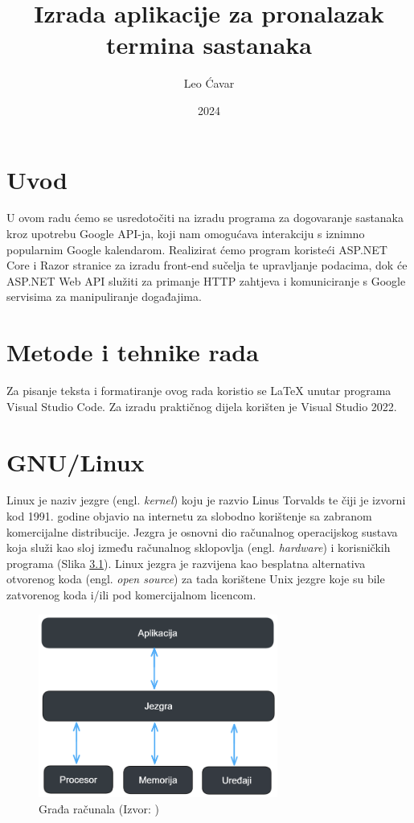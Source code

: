\documentclass{foi}
\title{Izrada aplikacije za pronalazak termina sastanaka}
\author{Leo Ćavar}
\date{2024}
\begin{document}
\maketitle

\tableofcontents

\pagestyle{plain}
\chapter{Uvod}
U ovom radu ćemo se usredotočiti na izradu programa za dogovaranje sastanaka kroz upotrebu Google API-ja, koji nam omogućava interakciju s iznimno popularnim Google kalendarom. Realizirat ćemo program koristeći ASP.NET Core i Razor stranice za izradu front-end sučelja te upravljanje podacima, dok će ASP.NET Web API služiti za primanje HTTP zahtjeva i komuniciranje s Google servisima za manipuliranje događajima.

\chapter{Metode i tehnike rada}
Za pisanje teksta i formatiranje ovog rada koristio se LaTeX unutar programa Visual Studio Code. Za izradu praktičnog dijela korišten je Visual Studio 2022.

\chapter{GNU/Linux}
Linux je naziv jezgre (engl. \textit{kernel}) koju je razvio Linus Torvalds te čiji je izvorni kod 1991. godine objavio na internetu za slobodno korištenje sa zabranom komercijalne distribucije.\cite{GNU} Jezgra je osnovni dio računalnog operacijskog sustava koja služi kao sloj između računalnog sklopovlja (engl. \textit{hardware}) i korisničkih programa\cite{Carnet} (Slika \ref{fig:grada}). Linux jezgra je razvijena kao besplatna alternativa otvorenog koda (engl. \textit{open source}) za tada korištene Unix jezgre koje su bile zatvorenog koda i/ili pod komercijalnom licencom. \cite{GNU}

\begin{figure}[h]
    \centering
    \includegraphics[width=0.7\textwidth]{slike/Grada_racunala.png}
    \caption{Građa računala (Izvor: \citeauthor{Grada})}
    \label{fig:grada}
\end{figure}
\end{document}
